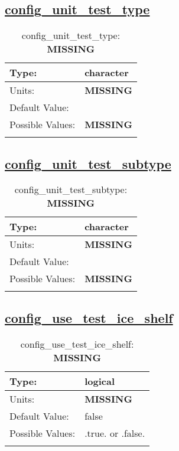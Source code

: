 \subsection[config\_unit\_test\_type]{\hyperref[sec:nm_tab_unit_test]{config\_unit\_test\_type}}
\label{subsec:nm_sec_config_unit_test_type}
\begin{center}
\begin{longtable}{| p{2.0in} || p{4.0in} |}
    \hline
    Type: & character \\
    \hline
    Units: & {\bf \color{red} MISSING} \\
    \hline
    Default Value: &  \\
    \hline
    Possible Values: & {\bf \color{red} MISSING} \\
    \hline
    \caption{config\_unit\_test\_type: {\bf \color{red} MISSING}}
\end{longtable}
\end{center}
\subsection[config\_unit\_test\_subtype]{\hyperref[sec:nm_tab_unit_test]{config\_unit\_test\_subtype}}
\label{subsec:nm_sec_config_unit_test_subtype}
\begin{center}
\begin{longtable}{| p{2.0in} || p{4.0in} |}
    \hline
    Type: & character \\
    \hline
    Units: & {\bf \color{red} MISSING} \\
    \hline
    Default Value: &  \\
    \hline
    Possible Values: & {\bf \color{red} MISSING} \\
    \hline
    \caption{config\_unit\_test\_subtype: {\bf \color{red} MISSING}}
\end{longtable}
\end{center}
\subsection[config\_use\_test\_ice\_shelf]{\hyperref[sec:nm_tab_unit_test]{config\_use\_test\_ice\_shelf}}
\label{subsec:nm_sec_config_use_test_ice_shelf}
\begin{center}
\begin{longtable}{| p{2.0in} || p{4.0in} |}
    \hline
    Type: & logical \\
    \hline
    Units: & {\bf \color{red} MISSING} \\
    \hline
    Default Value: & false \\
    \hline
    Possible Values: & .true. or .false. \\
    \hline
    \caption{config\_use\_test\_ice\_shelf: {\bf \color{red} MISSING}}
\end{longtable}
\end{center}

